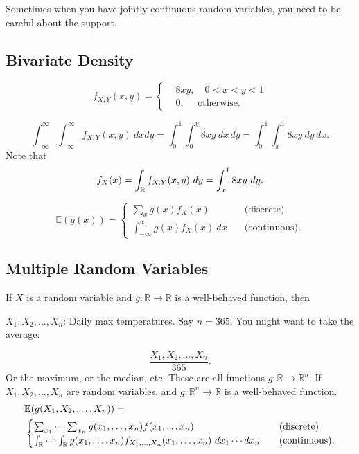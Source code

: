 

\begin{note}
		Sometimes when you have jointly continuous random variables, you need to be careful about the support.
\end{note}

\subsection{Bivariate Density}

\begin{eg}
$$f_{X,Y}(x,y)=\begin{cases}&8xy, \quad 0<x<y<1 \\ &0, \quad \text{ otherwise.}\end{cases}$$ 

$$
\int^{\infty}_{-\infty}\int^{\infty}_{-\infty}f_{X,Y}(x,y) \ dxdy =\int^{1}_{0}\int^{y}_{0}8xy \ dx \, dy
=\int^{1}_{0}\int^{1}_{x}8xy\ dy \, dx. 
$$
Note that
$$
f_X(x)=\int_{\mathbb R} f_{X,Y}(x,y) \ dy = \int^1_x 8xy \ dy.
$$
\end{eg}
$$
\mathbb E(g(x)) = \begin{cases}\sum_xg(x)f_X(x) \quad &\text {(discrete)} \\ \int^\infty_{-\infty}g(x)f_X(x) \ dx \quad &\text{(continuous).}\end{cases}
$$

\subsection{Multiple Random Variables}
\begin{recall}
		If $X$ is a random variable and $g:\mathbb R\to \mathbb R$ is a well-behaved function, then
\end{recall}

\begin{eg}
$X_1, X_2,\ldots,X_n$: Daily max temperatures. Say $n=365.$ You might want to take the average:

$$
\frac{X_1, X_2,\ldots,X_n}{365}.
$$
Or the maximum, or the median, etc. These are all functions $g:\mathbb R \to \mathbb R^n.$ If $X_1, X_2,\ldots,X_n$ are random variables, and $g:\mathbb R^n\to \mathbb R$ is a well-behaved function.
\begin{align*}
&\mathbb E(g(X_1, X_2,\ldots,X_n))= \\
&\begin{cases}\sum_{x_1}\cdots\sum_{x_n} g(x_1,\ldots,x_n)f(x_1,\dots x_n) &\text{(discrete)} 
\\ \intR\cdots \intR g(x_1,\dots,x_n)f_{X_1,\dots,X_n}(x_1,\dots,x_n) \ dx_1 \cdots dx_n \quad &\text{(continuous).}\end{cases}
\end{align*}
\end{eg}

